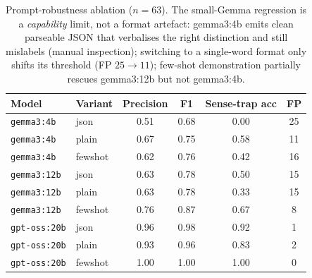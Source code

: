 \begin{table}[t]
\centering
\small
\begin{tabular}{llcccc}
\toprule
Model & Variant & Precision & F1 & Sense-trap acc & FP \\
\midrule
\texttt{gemma3:4b} & json & 0.51 & 0.68 & 0.00 & 25 \\
\texttt{gemma3:4b} & plain & 0.67 & 0.75 & 0.58 & 11 \\
\texttt{gemma3:4b} & fewshot & 0.62 & 0.76 & 0.42 & 16 \\
\texttt{gemma3:12b} & json & 0.63 & 0.78 & 0.50 & 15 \\
\texttt{gemma3:12b} & plain & 0.63 & 0.78 & 0.33 & 15 \\
\texttt{gemma3:12b} & fewshot & 0.76 & 0.87 & 0.67 & 8 \\
\texttt{gpt-oss:20b} & json & 0.96 & 0.98 & 0.92 & 1 \\
\texttt{gpt-oss:20b} & plain & 0.93 & 0.96 & 0.83 & 2 \\
\texttt{gpt-oss:20b} & fewshot & 1.00 & 1.00 & 1.00 & 0 \\
\bottomrule
\end{tabular}
\caption{Prompt-robustness ablation ($n=63$). The small-Gemma regression is a
\emph{capability} limit, not a format artefact: gemma3:4b emits clean parseable JSON
that verbalises the right distinction and still mislabels (manual inspection); switching to
a single-word format only shifts its threshold (FP $25\!\to\!11$); few-shot
demonstration partially rescues gemma3:12b but not gemma3:4b.}
\label{tab:prompt_robustness}
\end{table}
